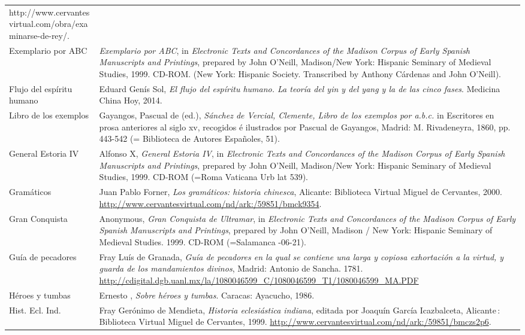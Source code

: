 \begin{tabularx}{\textwidth}{XX}
http://www.cervantesvirtual.com/obra/examinarse-de-rey/.\\
Exemplario por ABC  & \textit{Exemplario por ABC}, in \textit{Electronic Texts and Concordances of the Madison Corpus of Early Spanish Manuscripts and Printings}, prepared by John O’Neill, Madison/New York: Hispanic Seminary of Medieval Studies, 1999. CD-ROM. (New York: Hispanic Society. Transcribed by Anthony Cárdenas and John O'Neill).\\
Flujo del espíritu humano & Eduard Genís Sol, \textit{El flujo del espíritu humano. La teoría del yin y del yang y la de las cinco fases}. Medicina China Hoy, 2014.\\
Libro de los exemplos & Gayangos, Pascual de (ed.), \textit{Sánchez de Vercial, Clemente, Libro de los exemplos por a.b.c.} in Escritores en prosa anteriores al siglo xv, recogidos é ilustrados por Pascual de Gayangos, Madrid: M. Rivadeneyra, 1860, pp. 443-542 (= Biblioteca de Autores Españoles, 51).\\
General Estoria IV & Alfonso X, \textit{General Estoria IV}, in \textit{Electronic Texts and Concordances of the Madison Corpus of Early Spanish Manuscripts and Printings}, prepared by John O’Neill, Madison/New York: Hispanic Seminary of Medieval Studies, 1999. CD-ROM (=Roma Vaticana Urb lat 539).\\
Gramáticos & Juan Pablo Forner, \textit{Los gramáticos: historia chinesca}, Alicante: Biblioteca Virtual Miguel de Cervantes, 2000. \url{http://www.cervantesvirtual.com/nd/ark:/59851/bmck9354}.\\
Gran Conquista & Anonymous, \textit{Gran Conquista de Ultramar}, in \textit{Electronic Texts and Concordances of the Madison Corpus of Early Spanish Manuscripts and Printings}, prepared by John O’Neill, Madison / New York: Hispanic Seminary of Medieval Studies. 1999. CD-ROM (=Salamanca \citealt{Giesser1503}-06-21).\\
Guía de pecadores & Fray Luís de Granada, \textit{Guía de pecadores en la qual se contiene una larga y copiosa exhortación a la virtud, y guarda de los mandamientos divinos}, Madrid: Antonio de Sancha. 1781. \url{http://cdigital.dgb.uanl.mx/la/1080046599_C/1080046599_T1/1080046599_MA.PDF}\\
Héroes y tumbas & Ernesto \citet{Sábato1961}, \textit{Sobre héroes y tumbas}. Caracas: Ayacucho, 1986.\\
Hist. Ecl. Ind. & Fray Gerónimo de Mendieta, \textit{Historia eclesiástica indiana}, editada por Joaquín García Icazbalceta, Alicante : Biblioteca Virtual Miguel de Cervantes, 1999. \url{http://www.cervantesvirtual.com/nd/ark:/59851/bmczs2p6}.\\

\end{tabularx}
